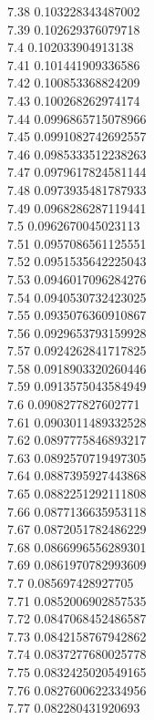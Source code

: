 {7.38	0.103228343487002\\
7.39	0.102629376079718\\
7.4	0.102033904913138\\
7.41	0.101441909336586\\
7.42	0.100853368824209\\
7.43	0.100268262974174\\
7.44	0.0996865715078966\\
7.45	0.0991082742692557\\
7.46	0.0985333512238263\\
7.47	0.0979617824581144\\
7.48	0.0973935481787933\\
7.49	0.0968286287119441\\
7.5	0.0962670045023113\\
7.51	0.0957086561125551\\
7.52	0.0951535642225043\\
7.53	0.0946017096284276\\
7.54	0.0940530732423025\\
7.55	0.0935076360910867\\
7.56	0.0929653793159928\\
7.57	0.0924262841717825\\
7.58	0.0918903320260446\\
7.59	0.0913575043584949\\
7.6	0.0908277827602771\\
7.61	0.0903011489332528\\
7.62	0.0897775846893217\\
7.63	0.0892570719497305\\
7.64	0.0887395927443868\\
7.65	0.0882251292111808\\
7.66	0.0877136635953118\\
7.67	0.0872051782486229\\
7.68	0.0866996556289301\\
7.69	0.0861970782993609\\
7.7	0.085697428927705\\
7.71	0.0852006902857535\\
7.72	0.0847068452486587\\
7.73	0.0842158767942862\\
7.74	0.0837277680025778\\
7.75	0.0832425020549165\\
7.76	0.0827600622334956\\
7.77	0.082280431920693\\
}
